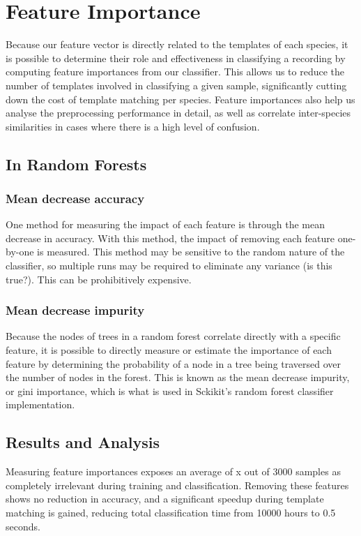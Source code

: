 \section{Feature Importance}\label{sec:feature_imp}
Because our feature vector is directly related to the templates of each species,
it is possible to determine their role and effectiveness in classifying a
recording by computing feature importances from our classifier.
This allows us to reduce the number of templates involved in classifying a given
sample, significantly cutting down the cost of template matching per species.
Feature importances also help us analyse the preprocessing performance in detail,
as well as correlate inter-species similarities in cases where there is a high
level of confusion.

\subsection{In Random Forests}

\subsubsection{Mean decrease accuracy}
One method for measuring the impact of each feature is through the mean decrease
in accuracy.
With this method, the impact of removing each feature one-by-one is measured.
This method may be sensitive to the random nature of the classifier, so multiple
runs may be required to eliminate any variance (is this true?).
This can be prohibitively expensive.

\subsubsection{Mean decrease impurity}
Because the nodes of trees in a random forest correlate directly with a specific
feature, it is possible to directly measure or estimate the importance of each
feature by determining the probability of a node in a tree being traversed over 
the number of nodes in the forest.
This is known as the mean decrease impurity, or gini importance, which is what
is used in Sckikit's random forest classifier implementation.

\subsection{Results and Analysis}

Measuring feature importances exposes an average of x out of 3000 samples as
completely irrelevant during training and classification.
Removing these features shows no reduction in accuracy, and a significant speedup
during template matching is gained, reducing total classification time from 10000
hours to 0.5 seconds.

